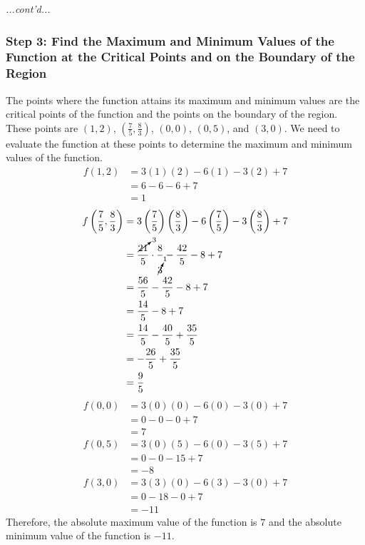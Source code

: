 \documentclass{article}
\begin{document}
\begin{examplebox}
    \textit{...cont'd...}
    \begin{solutionbox}
        \subsubsection*{Step 3: Find the Maximum and Minimum Values of the Function at the Critical Points and on the Boundary of the Region}
        The points where the function attains its maximum and minimum values are the critical points of the function and the points on the boundary of the region. These points are \( (1, 2) \), \( (\frac{7}{5}, \frac{8}{3}) \), \( (0, 0) \), \( (0, 5) \), and \( (3, 0) \). We need to evaluate the function at these points to determine the maximum and minimum values of the function. \\
        \begin{align*}
            f(1, 2) &= 3(1)(2) - 6(1) - 3(2) + 7 \\
            &= 6 - 6 - 6 + 7 \\
            &= 1
        \end{align*}
        \begin{align*}
            f \left( \dfrac{7}{5}, \dfrac{8}{3} \right) &= 3 \left( \dfrac{7}{5} \right) \left( \dfrac{8}{3} \right) - 6 \left( \dfrac{7}{5} \right) - 3 \left( \dfrac{8}{3} \right) + 7 \\
            &= \dfrac{\cancelto{3}{21}}{5} \cdot \dfrac{8}{\cancelto{1}{3}} - \dfrac{42}{5} - 8 + 7 \\
            &= \dfrac{56}{5} - \dfrac{42}{5} - 8 + 7 \\
            &= \dfrac{14}{5} - 8 + 7 \\
            &= \dfrac{14}{5} - \dfrac{40}{5} + \dfrac{35}{5} \\
            &= -\dfrac{26}{5} + \dfrac{35}{5} \\
            &= \dfrac{9}{5}
        \end{align*}
        \begin{align*}
            f(0, 0) &= 3(0)(0) - 6(0) - 3(0) + 7 \\
            &= 0 - 0 - 0 + 7 \\
            &= 7
        \end{align*}
        \begin{align*}
            f(0, 5) &= 3(0)(5) - 6(0) - 3(5) + 7 \\
            &= 0 - 0 - 15 + 7 \\
            &= -8
        \end{align*}
        \begin{align*}
            f(3, 0) &= 3(3)(0) - 6(3) - 3(0) + 7 \\
            &= 0 - 18 - 0 + 7 \\
            &= -11
        \end{align*}
        Therefore, the absolute maximum value of the function is \( 7 \) and the absolute minimum value of the function is \( -11 \).
    \end{solutionbox}
\end{examplebox}
\end{document}
